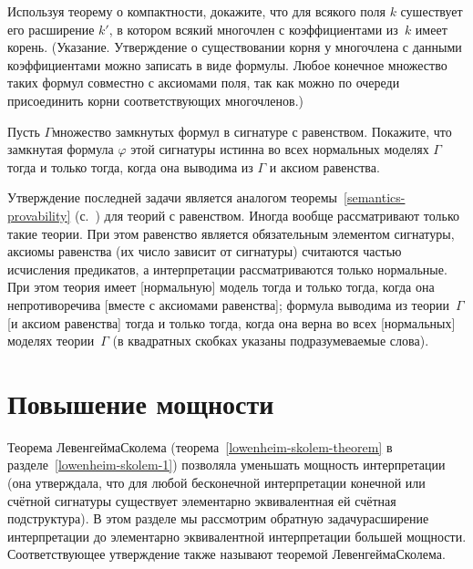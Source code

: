 \begin{problem}
Используя теорему о компактности, докажите, что для всякого поля
$k$ сушествует его расширение $k'$, в котором всякий многочлен с
коэффициентами из~$k$ имеет корень. (Указание. Утверждение о
существовании корня у многочлена с данными коэффициентами можно
записать в виде формулы. Любое конечное множество таких формул
совместно с аксиомами поля, так как можно по очереди
присоединить корни соответствующих многочленов.)
\end{problem}

\begin{problem}
Пусть $\Gamma$\т множество замкнутых формул в сигнатуре с
равенством. Покажите, что замкнутая формула $\varphi$ этой
сигнатуры истинна во всех нормальных моделях $\Gamma$ тогда и
только тогда, когда она выводима из $\Gamma$ и аксиом равенства.
\end{problem}

Утверждение последней задачи является аналогом
теоремы~\ref{semantics-provability}
(с.~\pageref{semantics-provability}) для теорий с равенством.
Иногда вообще рассматривают только такие теории. При этом
равенство является обязательным элементом сигнатуры, аксиомы
равенства (их число зависит от сигнатуры) считаются частью
исчисления предикатов, а интерпретации рассматриваются только
нормальные. При этом теория имеет [нормальную] модель тогда и
только тогда, когда она непротиворечива [вместе с аксиомами
равенства]; формула выводима из теории~$\Gamma$ [и аксиом
равенства] тогда и только тогда, когда она верна во всех
[нормальных] моделях теории~$\Gamma$  (в квадратных скобках
указаны подразумеваемые слова).

\section{Повышение мощности}
        \label{lowenheim-skolem-2}
Теорема Левенгейма\ч Сколема
(теорема~\ref{lowenheim-skolem-theorem} в
разделе~\ref{lowenheim-skolem-1}) позволяла уменьшать
мощность интерпретации (она утверждала, что для любой
бесконечной интерпретации конечной или счётной сигнатуры
существует элементарно эквивалентная ей счётная подструктура). В
этом разделе мы рассмотрим обратную задачу\т расширение
интерпретации до элементарно эквивалентной интерпретации большей
мощности. Соответствующее утверждение также называют теоремой
Левенгейма\ч Сколема.

